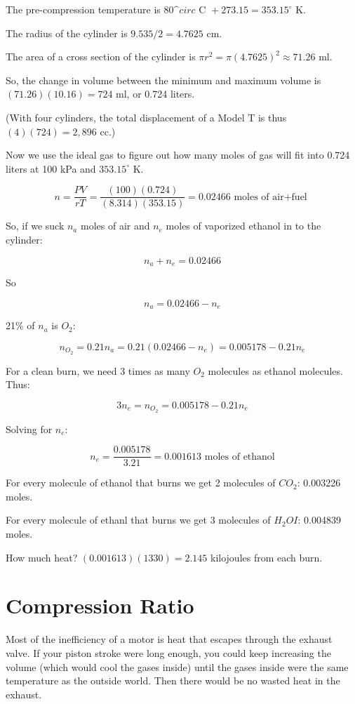 \begin{Answer}[ref=fuelmix] 

The pre-compression temperature is $80\^circ \text{ C } + 273.15 = 353.15^\circ$ K.

The radius of the cylinder is $9.535/2 =4.7625$ cm.

The area of a cross section of the cylinder is $\pi r^2 = \pi (4.7625)^2 \approx 71.26$ ml.

So, the change in volume between the minimum and maximum volume is $ (71.26)(10.16) = 724$ ml, or 0.724 liters.

(With four cylinders, the total displacement of a Model T is thus $ (4)(724) = 2,896$ cc.)

Now we use the ideal gas to figure out how many moles of gas will fit into 0.724 liters at 100 kPa and $353.15^\circ$ K.

$$n = \frac{PV}{rT} = \frac{(100)(0.724)}{(8.314)(353.15)} = 0.02466 \text{ moles of air+fuel }$$ 

So, if we suck $n_a$ moles of air and $n_e$ moles of vaporized ethanol in to the cylinder:

$$n_a + n_e = 0.02466$$

So

$$n_a = 0.02466 - n_e$$

21\% of $n_a$ is $O_2$:

$$n_{O_2} = 0.21 n_a = 0.21 (0.02466 - n_e) = 0.005178 - 0.21 n_e$$

For a clean burn, we need 3 times as many $O_2$ molecules as ethanol molecules. Thus:

$$3 n_e =  n_{O_2} = 0.005178 - 0.21 n_e$$

Solving for $n_e$:

$$n_e = \frac{0.005178}{3.21} = 0.001613 \text{ moles of ethanol}$$

For every molecule of ethanol that burns we get 2 molecules of $CO_2$: 0.003226 moles.

For every molecule of ethanl that burns we get 3 molecules of $H_2OI$: 0.004839 moles.

How much heat? $(0.001613)(1330) = 2.145$ kilojoules from each burn.

\end{Answer}

\section{Compression Ratio}

Most of the inefficiency of a motor is heat that escapes through the exhaust valve. If your piston stroke were long enough, you could keep increasing the volume (which would cool the gases inside) until the gases inside were the same temperature as the outside world. Then there would be no wasted heat in the exhaust.


